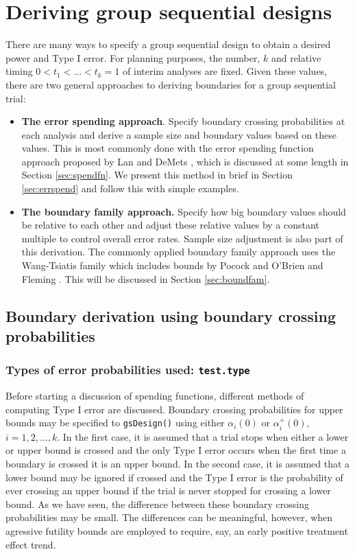 \section{Deriving group sequential designs \label{sec:gsDesign}}
There are many ways to specify a group sequential design to obtain a desired power and Type I error. 
For planning purposes, the number, $k$ and relative timing $0<t_1<...<t_k=1$ of interim analyses are fixed.
Given these values, there are two general approaches to deriving boundaries for a group sequential trial:
\begin{itemize}
\item {\bf The error spending approach}. Specify boundary crossing probabilities at each analysis and derive a sample size and boundary values based on these values.
This is most commonly done with the error spending function approach proposed by Lan and DeMets \cite{LanDeMets}, which is discussed at some length in Section \ref{sec:spendfn}. 
We present this method in brief in Section \ref{sec:errspend} and follow this with simple examples.
\item {\bf The boundary family approach.} Specify how big boundary values should be relative to each other and adjust these relative values by a constant multiple to control overall error rates. Sample size adjustment is also part of this derivation. The commonly applied boundary family approach uses the Wang-Tsiatis \cite{WangTsiatis} family which includes bounds by Pocock \cite{PocockBound} and O'Brien and Fleming \cite{OF}. This will be discussed in Section \ref{sec:boundfam}.
\end{itemize}

\subsection{Boundary derivation using boundary crossing probabilities \label{sec:errspend}}
\subsubsection{Types of error probabilities used: \texttt{test.type}}
Before starting a discussion of spending functions, different methods of computing Type I error are discussed.
Boundary crossing probabilities for upper bounds may be specified to \texttt{gsDesign()} using either $\alpha_i(0)$ or $\alpha_i^+(0)$, $i=1,2,\ldots,k$.
In the first case, it is assumed that a trial stops when either a lower or upper bound is crossed and the only Type I error occurs when the first time a boundary is crossed it is an upper bound.
In the second case, it is assumed that a lower bound may be ignored if crossed and the Type I error is the probability of ever crossing an upper bound if the trial is never stopped for crossing a lower bound.
As we have seen, the difference between these boundary crossing probabilities may be small.
The differences can be meaningful, however, when agressive futility bounds are employed to require, say, an early positive treatment effect trend.


